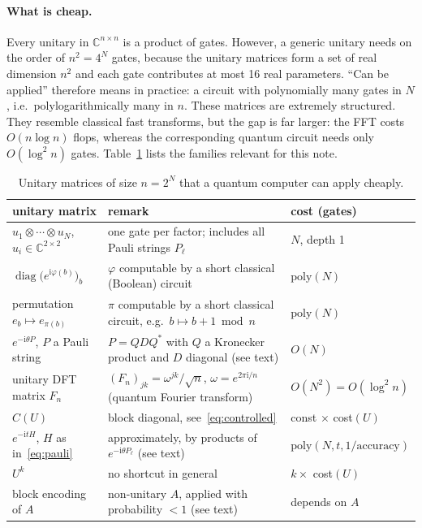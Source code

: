 \documentclass[11pt,a4paper]{article}
\newcommand{\C}{\mathbb{C}}
\begin{document}
\paragraph{What is cheap.} Every unitary in $\C^{n\times n}$ is a product of
gates. However, a generic unitary needs on the order of $n^2=4^N$ gates,
because the unitary matrices form a set of real dimension $n^2$ and each
gate contributes at most 16 real parameters. ``Can be applied'' therefore
means in practice: a circuit with polynomially many gates in $N$, i.e.\
polylogarithmically many in $n$. These matrices are extremely structured.
They resemble classical fast transforms, but the gap is far larger: the
FFT costs $O(n\log n)$ flops, whereas the corresponding quantum circuit
needs only $O(\log^2 n)$ gates. Table~\ref{tab:unitaries} lists the
families relevant for this note.

\begin{table}[t]
\centering
\small
\renewcommand{\arraystretch}{1.15}
\begin{tabular}{@{}p{4.4cm}p{6.6cm}p{3.6cm}@{}}
\toprule
unitary matrix & remark & cost (gates)\\ \midrule
$u_1\otimes\cdots\otimes u_N$, $u_i\in\C^{2\times 2}$ & one gate per factor; includes all Pauli strings $P_\ell$ & $N$, depth 1\\
$\operatorname{diag}\big(e^{\mathrm{i}\varphi(b)}\big)_b$ & $\varphi$ computable by a short classical (Boolean) circuit & $\mathrm{poly}(N)$\\
permutation $e_b\mapsto e_{\pi(b)}$ & $\pi$ computable by a short classical circuit, e.g.\ $b\mapsto b+1 \bmod n$ & $\mathrm{poly}(N)$\\
$e^{-\mathrm{i}\theta P}$, $P$ a Pauli string & $P=QDQ^*$ with $Q$ a Kronecker product and $D$ diagonal (see text) & $O(N)$\\
unitary DFT matrix $F_n$ & $(F_n)_{jk}=\omega^{jk}/\sqrt n$, $\omega=e^{2\pi\mathrm{i}/n}$ (quantum Fourier transform) & $O(N^2)=O(\log^2n)$\\
$C(U)$ & block diagonal, see~\eqref{eq:controlled} & const $\times$ cost$(U)$\\
$e^{-\mathrm{i}tH}$, $H$ as in~\eqref{eq:pauli} & approximately, by products of $e^{-\mathrm{i}\theta P_\ell}$ (see text) & $\mathrm{poly}(N,t,1/\text{accuracy})$\\
$U^k$ & no shortcut in general & $k\times$ cost$(U)$\\
block encoding of $A$ & non-unitary $A$, applied with probability $<1$ (see text) & depends on $A$\\
\bottomrule
\end{tabular}
\caption{Unitary matrices of size $n=2^N$ that a quantum computer can apply
cheaply.}
\label{tab:unitaries}
\end{table}
\end{document}
